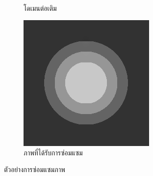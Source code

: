 \documentclass[xcolor=dvipsnames, xetex,serif]{beamer}
\numberwithin{equation}{section}
\begin{document}
\begin{frame}
\begin{figure}[H]
\begin{subfigure}{0.3\linewidth}
                \caption{โดเมนต่อเติม}
            \end{subfigure}
            \begin{subfigure}{0.3\linewidth}
                \centering
                \includegraphics[width=0.8\linewidth]{images/grayscale_inpaint/result_splitbergman.png}
                \caption{ภาพที่ได้รับการซ่อมแซม}
            \end{subfigure}
            \caption{ตัวอย่างการซ่อมแซมภาพ}
            \label{fig1}
        \end{figure}
    \end{frame}
\end{document}
